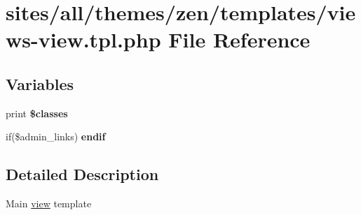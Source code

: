 \hypertarget{themes_2zen_2templates_2views-view_8tpl_8php}{
\section{sites/all/themes/zen/templates/views-view.tpl.php File Reference}
\label{themes_2zen_2templates_2views-view_8tpl_8php}
}
\subsection*{Variables}
\begin{CompactItemize}
\item 
\hypertarget{themes_2zen_2templates_2views-view_8tpl_8php_6d48ecbdbc70ca1812e665169b5fa1e2}{
print \textbf{\$classes}}
\label{themes_2zen_2templates_2views-view_8tpl_8php_6d48ecbdbc70ca1812e665169b5fa1e2}

\item 
\hypertarget{themes_2zen_2templates_2views-view_8tpl_8php_97b8be73630a68d46603ea9f55f6957c}{
if(\$admin\_\-links) \textbf{endif}}
\label{themes_2zen_2templates_2views-view_8tpl_8php_97b8be73630a68d46603ea9f55f6957c}

\end{CompactItemize}


\subsection{Detailed Description}
Main \hyperlink{classview}{view} template

